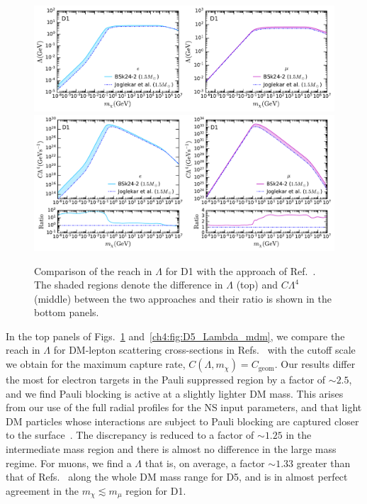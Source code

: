 \begin{figure}[t!bp]
    \centering
    \includegraphics[width=\textwidth]{capture_2/D1_Lambda_mdm_leptons.pdf}\\
    \vspace*{-0.5em}    
    \includegraphics[width=\textwidth]{capture_2/D1_C_mdm_leptons.pdf}     
    \caption{Comparison of the reach in $\Lambda$ for D1 with the approach of Ref.~\cite{Joglekar:2020liw_Darkkineticheating}. The shaded regions denote the difference in $\Lambda$ (top) and $C\Lambda^4$ (middle) between the two approaches and their ratio is shown in the bottom panels.}
    \label{ch4:fig:D1_Lambda_mdm}
\end{figure}


    
In the top panels of Figs.~\ref{ch4:fig:D1_Lambda_mdm} and~\ref{ch4:fig:D5_Lambda_mdm}, we compare the reach in $\Lambda$ for DM-lepton scattering cross-sections in Refs.~\cite{Joglekar:2019vzy_sep_Relativisticcapturedark,Joglekar:2020liw_Darkkineticheating} with the cutoff scale we obtain for the maximum capture rate, $C(\Lambda,m_\chi)=C_\mathrm{geom}$. 
Our results differ the most for electron targets in the Pauli suppressed region by a factor of $\sim 2.5$, and we find Pauli blocking is active at a slightly lighter DM mass. This arises from our use of the full radial profiles for the NS input parameters, and that light DM particles whose interactions are subject to Pauli blocking are captured closer to the surface~\cite{Bell:2020jou_sep_ImprovedTreatmentDark}. The discrepancy is reduced to a factor of  $\sim 1.25$ in the intermediate mass region and there is almost no difference in the large mass regime. For muons, we find a $\Lambda$ that is, on average, a factor $\sim 1.33$ greater than that of Refs.~\cite{Joglekar:2019vzy_sep_Relativisticcapturedark,Joglekar:2020liw_Darkkineticheating} along the whole DM mass range for D5,  and is in almost perfect agreement in the $m_\chi\lesssim m_\mu$ region for D1. 



